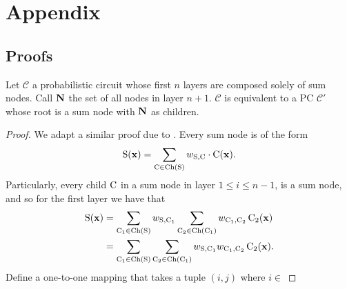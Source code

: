 
\chapter{Appendix}

\section{Proofs}

\begin{theorem}
  \label{thm:summix}
  Let $\mathcal{C}$ a probabilistic circuit whose first $n$ layers are composed solely of sum
  nodes. Call $\set{N}$ the set of all nodes in layer $n+1$. $\mathcal{C}$ is equivalent to a PC
  $\mathcal{C}'$ whose root is a sum node with $\set{N}$ as children.
\end{theorem}
\begin{proof}
  We adapt a similar proof due to \citet{jaini18b}. Every sum node is of the form
  \begin{equation*}
    \Sum(\set{x})=\sum_{\Child\in\Ch(\Sum)}w_{\Sum,\Child}\cdot\Child(\set{x}).
  \end{equation*}
  Particularly, every child $\Child$ in a sum node in layer $1\leq i\leq n-1$, is a sum node, and
  so for the first layer we have that
  \begin{align*}
    \Sum(\set{x})&=\sum_{\Child_1\in\Ch(\Sum)}w_{\Sum,\Child_1}\sum_{\Child_2\in\Ch(\Child_1)}
    w_{\Child_1,\Child_2}\Child_2(\set{x})\\
                 &=\sum_{\Child_1\in\Ch(\Sum)}\sum_{\Child_2\in\Ch(\Child_1)}w_{\Sum,\Child_1}
    w_{\Child_1,\Child_2}\Child_2(\set{x}).
  \end{align*}
  Define a one-to-one mapping that takes a tuple $(i,j)$ where $i\in$

\end{proof}
